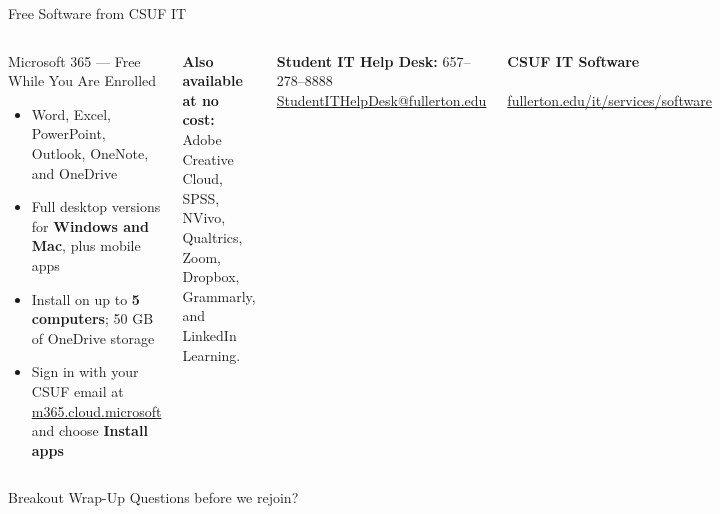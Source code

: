 \documentclass[10pt,aspectratio=169]{beamer}
\begin{document}
\begin{frame}{Free Software from CSUF IT}
\small
\begin{columns}[c,onlytextwidth]
  \begin{block}{Microsoft 365 --- Free While You Are Enrolled}
    \begin{itemize}\setlength{\itemsep}{2pt}
      \item Word, Excel, PowerPoint, Outlook, OneNote, and OneDrive
      \item Full desktop versions for \textbf{Windows and Mac}, plus mobile apps
      \item Install on up to \textbf{5 computers}; 50 GB of OneDrive storage
      \item Sign in with your CSUF email at \href{https://m365.cloud.microsoft}{m365.cloud.microsoft} and choose \textbf{Install apps}
    \end{itemize}
  \end{block}

  \vspace{0.2em}
  \textbf{Also available at no cost:} Adobe Creative Cloud, SPSS, NVivo, Qualtrics, Zoom, Dropbox, Grammarly, and LinkedIn Learning.

  \vspace{0.3em}
  \textbf{Student IT Help Desk:} 657--278--8888\\
  \href{mailto:StudentITHelpDesk@fullerton.edu}{StudentITHelpDesk@fullerton.edu}

    \centering
    \textbf{CSUF IT Software}\\[6pt]
    \\[6pt]
    \scriptsize\href{https://www.fullerton.edu/it/services/software/}{fullerton.edu/it/services/software}
\end{columns}
\end{frame}

{\CSUFUseDarkFooter
\begin{frame}[standout]{Breakout Wrap-Up}
  \huge Questions before we rejoin?
\end{frame}}
\end{document}
